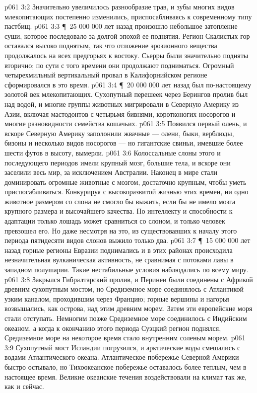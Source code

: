 \vs p061 3:2 Значительно увеличилось разнообразие трав, и зубы многих видов млекопитающих постепенно изменились, приспосабливаясь к современному типу пастбищ.
\vs p061 3:3 \P\ 25 000 000 лет назад произошло небольшое затопление суши, которое последовало за долгой эпохой ее поднятия. Регион Скалистых гор оставался высоко поднятым, так что отложение эрозионного вещества продолжалось на всех предгорьях к востоку. Сьерры были значительно подняты вторично; по сути с того времени они продолжают подниматься. Огромный четырехмильный вертикальный провал в Калифорнийском регионе сформировался в это время.
\vs p061 3:4 \P\ 20 000 000 лет назад был по\hyp{}настоящему золотой век млекопитающих. Сухопутный перешеек через Берингов пролив был над водой, и многие группы животных мигрировали в Северную Америку из Азии, включая мастодонтов с четырьмя бивнями, коротконогих носорогов и многие разновидности семейства кошачьих.
\vs p061 3:5 Появился первый олень, и вскоре Северную Америку заполонили жвачные --- олени, быки, верблюды, бизоны и несколько видов носорогов --- но гигантские свиньи, имевшие более шести футов в высоту, вымерли.
\vs p061 3:6 Колоссальные слоны этого и последующего периодов имели крупный мозг, большие тела, и вскоре они заселили весь мир, за исключением Австралии. Наконец в мире стали доминировать огромные животные с мозгом, достаточно крупным, чтобы уметь приспосабливаться. Конкурируя с высокоразвитой жизнью этих времен, ни одно животное размером со слона не смогло бы выжить, если бы не имело мозга крупного размера и высочайшего качества. По интеллекту и способности к адаптации только лошадь может сравниться со слоном, и только человек превзошел его. Но даже несмотря на это, из существовавших к началу этого периода пятидесяти видов слонов выжило только два.
\vs p061 3:7 \P\ 15 000 000 лет назад горные регионы Евразии поднимались и в этих районах происходила незначительная вулканическая активность, не сравнимая с потоками лавы в западном полушарии. Такие нестабильные условия наблюдались по всему миру.
\vs p061 3:8 Закрылся Гибралтарский пролив, и Перинеи были соединены с Африкой древним сухопутным мостом, но Средиземное море соединялось с Атлантикой узким каналом, проходившим через Францию; горные вершины и нагорья возвышались, как острова, над этим древним морем. Затем эти европейские моря стали отступать. Немногим позже Средиземное море соединилось с Индийским океаном, а когда к окончанию этого периода Суэцкий регион поднялся, Средиземное море на некоторое время стало внутренним соленым морем.
\vs p061 3:9 Сухопутный мост Исландии погрузился, и арктические воды смешались с водами Атлантического океана. Атлантическое побережье Северной Америки быстро остывало, но Тихоокеанское побережье оставалось более теплым, чем в настоящее время. Великие океанские течения воздействовали на климат так же, как и сейчас.
